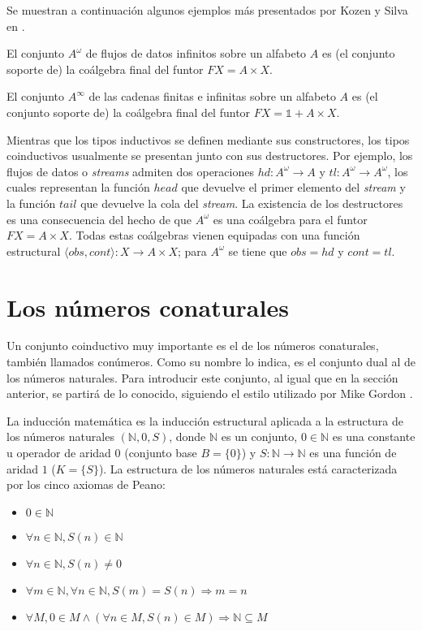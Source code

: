 Se muestran a continuación algunos ejemplos más presentados por Kozen y Silva en \cite{kozen:2017}.

\begin{ejemplo}
El conjunto $A^{\omega}$ de flujos de datos infinitos sobre un alfabeto $A$ es (el conjunto soporte de) la coálgebra final del funtor $\mathit{F}X = A \times X$.
\end{ejemplo}

\begin{ejemplo}
El conjunto $A^{\infty}$ de las cadenas finitas e infinitas sobre un alfabeto $A$ es (el conjunto soporte de) la coálgebra final del funtor $\mathit{F}X = \mathds{1} + A \times X$.
\end{ejemplo}

Mientras que los tipos inductivos se definen mediante sus constructores, los tipos coinductivos usualmente se presentan junto con sus destructores. Por ejemplo, los flujos de datos o \textit{streams} admiten dos operaciones $hd: A^{\omega} \rightarrow A$ y $tl : A^{\omega} \rightarrow A^{\omega}$, los cuales representan la función $head$ que devuelve el primer elemento del \textit{stream} y la función $tail$ que devuelve la cola del \textit{stream}. La existencia de los destructores es una consecuencia del hecho de que $A^{\omega}$ es una coálgebra para el funtor $\mathit{F}X = A \times X$. Todas estas coálgebras vienen equipadas con una función estructural $\langle obs, cont \rangle  : X \rightarrow A \times X$; para $A^{\omega}$ se tiene que $obs = hd$ y $cont = tl$.

\section{Los números conaturales}\label{delay:conat}

Un conjunto coinductivo muy importante es el de los números conaturales, también llamados conúmeros. Como su nombre lo indica, es el conjunto dual al de los números naturales. Para introducir este conjunto, al igual que en la sección anterior, se partirá de lo conocido, siguiendo el estilo utilizado por Mike Gordon \cite{gordon:2017}.

La inducción matemática es la inducción estructural aplicada a la estructura de los números naturales $(\mathbb{N},0,S)$, donde $\mathbb{N}$ es un conjunto, $0 \in \mathbb{N}$ es una constante u operador de aridad $0$ (conjunto base $B = \{0\}$) y $S : \mathbb{N} \rightarrow \mathbb{N}$ es una función de aridad $1$ ($K = \{S\}$). La estructura de los números naturales está caracterizada por los cinco axiomas de Peano:
\begin{itemize}
\item $0 \in \mathbb{N}$
\item $\forall n \in \mathbb{N}, S(n) \in \mathbb{N}$
\item $\forall n \in \mathbb{N}, S(n) \neq 0$
\item $\forall m \in \mathbb{N}, \forall n \in \mathbb{N}, S(m) = S(n) \Rightarrow m = n$
\item $\forall M, 0 \in M \land (\forall n \in M, S(n) \in M) \Rightarrow \mathbb{N} \subseteq M$
\end{itemize}

